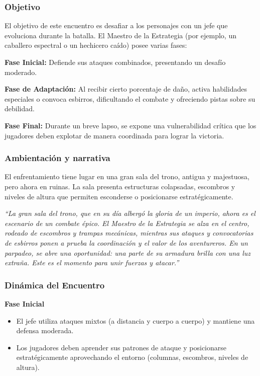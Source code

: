 \documentclass[
  twocolumn]{article}
\providecommand{\tightlist}{%
  \setlength{\itemsep}{0pt}\setlength{\parskip}{0pt}}
\begin{document}
\subsubsection{Objetivo}\label{objetivo-4}

El objetivo de este encuentro es desafiar a los personajes con un jefe
que evoluciona durante la batalla. El Maestro de la Estrategia (por
ejemplo, un caballero espectral o un hechicero caído) posee varias
fases:

\textbf{Fase Inicial:} Defiende sus ataques combinados, presentando un
desafío moderado.

\textbf{Fase de Adaptación:} Al recibir cierto porcentaje de daño,
activa habilidades especiales o convoca esbirros, dificultando el
combate y ofreciendo pistas sobre su debilidad.

\textbf{Fase Final:} Durante un breve lapso, se expone una
vulnerabilidad crítica que los jugadores deben explotar de manera
coordinada para lograr la victoria.

\subsubsection{Ambientación y
narrativa}\label{ambientaciuxf3n-y-narrativa-4}

El enfrentamiento tiene lugar en una gran sala del trono, antigua y
majestuosa, pero ahora en ruinas. La sala presenta estructuras
colapsadas, escombros y niveles de altura que permiten esconderse o
posicionarse estratégicamente.

\emph{``La gran sala del trono, que en su día albergó la gloria de un
imperio, ahora es el escenario de un combate épico. El Maestro de la
Estrategia se alza en el centro, rodeado de escombros y trampas
mecánicas, mientras sus ataques y convocatorias de esbirros ponen a
prueba la coordinación y el valor de los aventureros. En un parpadeo, se
abre una oportunidad: una parte de su armadura brilla con una luz
extraña. Este es el momento para unir fuerzas y atacar.''}

\subsubsection{Dinámica del
Encuentro}\label{dinuxe1mica-del-encuentro-3}

\textbf{Fase Inicial}

\begin{itemize}
\tightlist
\item
  El jefe utiliza ataques mixtos (a distancia y cuerpo a cuerpo) y
  mantiene una defensa moderada.
\item
  Los jugadores deben aprender sus patrones de ataque y posicionarse
  estratégicamente aprovechando el entorno (columnas, escombros, niveles
  de altura).
\end{itemize}
\end{document}
